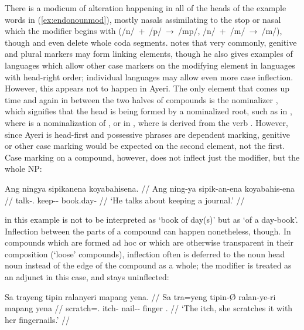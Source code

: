 There is a modicum of alteration happening in all of the heads of the example 
words in (\ref{ex:endonounmod}), mostly nasals assimilating to the stop or 
nasal which the modifier begins with (/n/~+~/p/~→~/mp/, /n/~+~/m/~→~/m/), 
though  and  even delete 
whole coda segments.
\citet[703]{bauer2001} notes that very commonly, genitive and plural markers 
may form linking elements, though he also gives examples of languages which
allow other case markers on the modifying element in languages with head-right
order; individual languages may allow even more case inflection. However, this
appears not to happen in Ayeri. The only element that comes up time and again
in between the two halves of compounds is the nominalizer ,
which signifies that the head is being formed by a nominalized root, such as in
, where  is a 
nominalization of , or in 
, where  is derived 
from the verb . However, since Ayeri is head-first and
possessive phrases are dependent marking, genitive or other case marking would
be expected on the second element, not the first. Case marking on a compound,
however, does not inflect just the modifier, but the whole NP:

\ex\begingl
	\gla Ang ningya sipikanena koyabahisena. //
	\glb Ang ning-ya sipik-an-ena koyabahis-ena //
	\glc \AgtT{} talk-\TsgM{}.\Top{} keep-\Nmlz{}-\Gen{} book.day-\Gen{} //
	\glft `He talks about keeping a journal.' //
\endgl\xe

 in this example is not to be interpreted as 
`book of day(s)' but as `of a day-book'. Inflection between the parts of a
compound can happen nonetheless, though. In compounds which are formed ad hoc
or which are otherwise transparent in their composition (`loose'
compounds\label{loosecomp}), inflection often is deferred to the noun head noun
instead of the edge of the compound as a whole; the modifier is treated as an
adjunct in this case, and stays uninflected:

\ex\label{ex:nouncompdiv}\begingl
	\gla Sa trayeng tipin ralanyeri mapang yena. //
	\glb Sa tra=yeng tipin-Ø ralan-ye-ri mapang yena //
	\glc \PatT{} scratch=\TsgF{}.\Aarg{} itch-\Top{} nail-\Pl{}-\Ins{} 
		finger \TsgF{}.\Gen{} //
	\glft `The itch, she scratches it with her fingernails.' //
\endgl\xe

